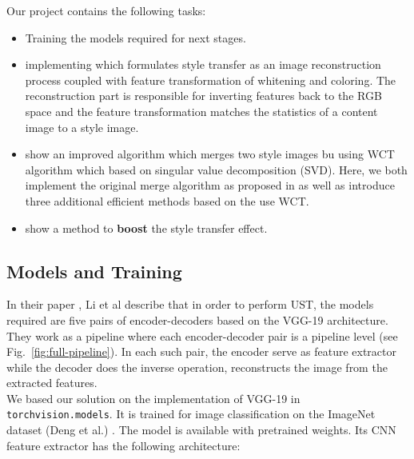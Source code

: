 \hspace{0.5cm} Our project contains the following tasks: 
\begin{itemize}
	\item Training the models required for next stages.
	\item implementing \cite{bib11} which formulates style transfer as an image reconstruction process coupled with feature transformation of whitening and coloring. The reconstruction part is responsible for inverting features back to the RGB space and the feature transformation matches the statistics of a content image to a style image.
	\item show an improved algorithm which merges two style images bu using WCT algorithm which based on singular value decomposition (SVD). Here, we both implement the original merge algorithm as proposed in \cite{bib11} as well as introduce three additional efficient methods based on the use WCT.
	\item show a method to \textbf{boost} the style transfer effect.
\end{itemize}

\subsection{Models and Training}
\hspace{0.5cm} In their paper \cite{bib11}, Li et al describe that in order to perform UST, the models required are five pairs of encoder-decoders based on the VGG-19 architecture. They work as a pipeline where each encoder-decoder pair is a pipeline level (see Fig.~\ref{fig:full-pipeline}). In each such pair, the encoder serve as feature extractor while the decoder does the inverse operation, reconstructs the image from the extracted features.\\
We based our solution on the implementation of VGG-19 \cite{bib20} in \texttt{torchvision.models}. It is trained for image classification on the ImageNet dataset (Deng et al.) \cite{bib21}. The model is available with pretrained weights. Its CNN feature extractor has the following architecture: 
\begin{gather*}
[64, 64, MP, 128, 128, MP, 256, 256, 256, 256, MP, 512, 512, 512, 512, MP, 512, 512, 512, 512, MP]
\end{gather*}

